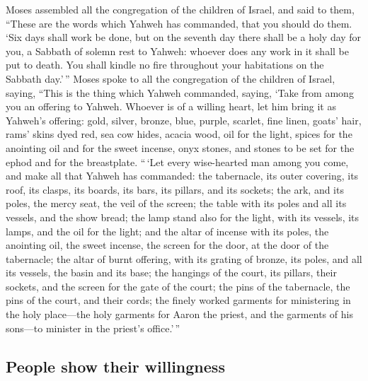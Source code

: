  Moses assembled all the congregation of the children of
Israel, and said to them, ``These are the words which Yahweh has
commanded, that you should do them.  `Six days shall work
be done, but on the seventh day there shall be a holy day for you, a
Sabbath of solemn rest to Yahweh: whoever does any work in it shall be
put to death.  You shall kindle no fire throughout your
habitations on the Sabbath day.'\,''  Moses spoke to all
the congregation of the children of Israel, saying, ``This is the thing
which Yahweh commanded, saying,  `Take from among you an
offering to Yahweh. Whoever is of a willing heart, let him bring it as
Yahweh's offering: gold, silver, bronze,  blue, purple,
scarlet, fine linen, goats' hair,  rams' skins dyed red,
sea cow hides, acacia wood,  oil for the light, spices for
the anointing oil and for the sweet incense,  onyx stones,
and stones to be set for the ephod and for the breastplate.
 ``\,`Let every wise-hearted man among you come, and make
all that Yahweh has commanded:  the tabernacle, its outer
covering, its roof, its clasps, its boards, its bars, its pillars, and
its sockets;  the ark, and its poles, the mercy seat, the
veil of the screen;  the table with its poles and all its
vessels, and the show bread;  the lamp stand also for the
light, with its vessels, its lamps, and the oil for the light;
 and the altar of incense with its poles, the anointing
oil, the sweet incense, the screen for the door, at the door of the
tabernacle;  the altar of burnt offering, with its
grating of bronze, its poles, and all its vessels, the basin and its
base;  the hangings of the court, its pillars, their
sockets, and the screen for the gate of the court;  the
pins of the tabernacle, the pins of the court, and their cords;
 the finely worked garments for ministering in the holy
place---the holy garments for Aaron the priest, and the garments of his
sons---to minister in the priest's office.'\,''

\hypertarget{people-show-their-willingness}{%
\subsection{People show their
willingness}\label{people-show-their-willingness}}


